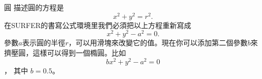 \begin{surferPage}{圓}
描述圓的方程是
\[x^2+y^2=r^2.\]
在SURFER的書寫公式環境里我們必須把以上方程重新寫成
\[x^2+y^2-a^2=0.\]
參數$a$表示圓的半徑$r$，可以用滑塊來改變它的值。現在你可以添加第二個參數$b$來擠壓圓，這樣可以得到一個橢圓。比如
\[bx^2+y^2-a^2=0\]， 其中 $b=0.5$。
\end{surferPage}
